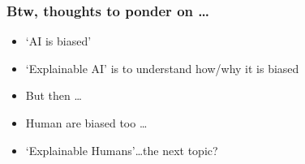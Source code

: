 \begin{frame}[fragile]\frametitle{Btw, thoughts to ponder on \ldots}
\begin{itemize}
\item ‘AI is biased'
\item ‘Explainable AI' is to understand how/why it is biased
\item But then \ldots
\item Human are biased too \ldots
\item ‘Explainable Humans'\ldots the next topic?
\end{itemize}
\end{frame}
